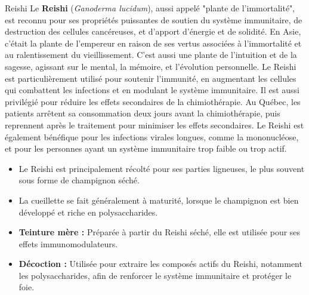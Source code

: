 \ficheidentiteplante
{Reishi}
{%
    Le \textbf{Reishi} (\textit{Ganoderma lucidum}), aussi appelé "plante de l'immortalité", est reconnu pour ses propriétés puissantes de soutien du système immunitaire, de destruction des cellules cancéreuses, et d'apport d'énergie et de solidité. En Asie, c'était la plante de l'empereur en raison de ses vertus associées à l'immortalité et au ralentissement du vieillissement. C'est aussi une plante de l'intuition et de la sagesse, agissant sur le mental, la mémoire, et l'évolution personnelle.
}
{%
    Le Reishi est particulièrement utilisé pour soutenir l'immunité, en augmentant les cellules qui combattent les infections et en modulant le système immunitaire. Il est aussi privilégié pour réduire les effets secondaires de la chimiothérapie. Au Québec, les patients arrêtent sa consommation deux jours avant la chimiothérapie, puis reprennent après le traitement pour minimiser les effets secondaires. Le Reishi est également bénéfique pour les infections virales longues, comme la mononucléose, et pour les personnes ayant un système immunitaire trop faible ou trop actif.
}
{%
    \begin{itemize}[label = \bcplume]
        \item Le Reishi est principalement récolté pour ses parties ligneuses, le plus souvent sous forme de champignon séché.
        \item La cueillette se fait généralement à maturité, lorsque le champignon est bien développé et riche en polysaccharides.
    \end{itemize}
}
{%
    \begin{itemize}
        \item \textbf{Teinture mère :} Préparée à partir du Reishi séché, elle est utilisée pour ses effets immunomodulateurs.
        \item \textbf{Décoction :} Utilisée pour extraire les composés actifs du Reishi, notamment les polysaccharides, afin de renforcer le système immunitaire et protéger le foie.
    \end{itemize}
}
